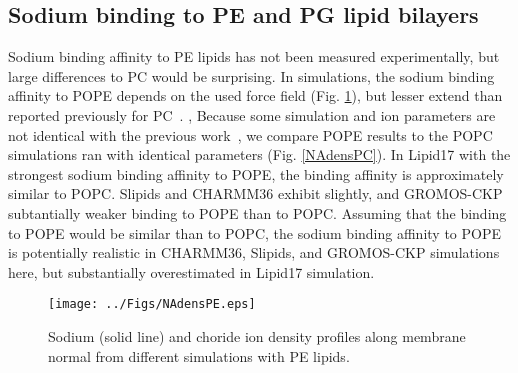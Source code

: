 \documentclass[aps,prl,superscriptaddress,twocolumn]{revtex4}
\begin{document}
\subsection{Sodium binding to PE and PG lipid bilayers}
Sodium binding affinity to PE lipids has not been measured experimentally,
but large differences to PC would be surprising. 
In simulations, the sodium binding affinity to POPE depends on the used force field (Fig. \ref{NAdensPE}),
but lesser extend than reported previously for PC~\cite{catte16}.
,
Because some simulation and ion parameters are not identical with the previous work~\cite{catte16},
we compare POPE results to the POPC simulations ran with identical parameters (Fig. \ref{NAdensPC}).
In Lipid17 with the strongest sodium binding affinity to POPE,
the binding affinity is approximately similar to POPC.
Slipids and CHARMM36 exhibit slightly, and
GROMOS-CKP subtantially weaker binding to POPE than to POPC.
Assuming that the binding
to POPE would be similar than to POPC, the sodium binding affinity to POPE
is potentially realistic in CHARMM36, Slipids, and GROMOS-CKP simulations here,
but substantially overestimated in Lipid17 simulation.
\begin{figure}[]
  \centering
  \texttt{[image: ../Figs/NAdensPE.eps]}
  \caption{\label{NAdensPE}
    Sodium (solid line) and choride ion density profiles along membrane normal
    from different simulations with PE lipids.
  }
\end{figure}
\end{document}
